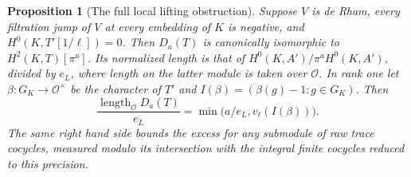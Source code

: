 \documentclass[a4paper,11pt]{article}
\newtheorem{proposition}{Proposition}[section]
\theoremstyle{definition}
\theoremstyle{remark}
\numberwithin{equation}{section}
\begin{document}
\begin{proposition}[The full local lifting obstruction]
\leavevmode\label{prop:negobstruction740}
Suppose \(V\) is de Rham, every filtration jump of \(V\) at every
embedding of \(K\) is negative, and \(H^0(K,T'[1/\ell])=0\).
Then \(D_a(T)\) is canonically isomorphic to \(H^2(K,T)[\pi^a]\).
Its normalized length is that of
\(H^0(K,A')/\pi^a H^0(K,A')\), divided by \(e_L\), where length
on the latter module is taken over \(\mathcal O\). In rank one
let \(\beta:G_K\to\mathcal O^\times\) be the character of \(T'\)
and \(I(\beta)=(\beta(g)-1:g\in G_K)\). Then
\[
     \frac{\operatorname{length}_{\mathcal O}D_a(T)}{e_L}
        =\min\bigl(a/e_L,v_\ell(I(\beta))\bigr).
 \tag{6}\label{eq:negobstruction740}
\]
The same right hand side bounds the excess for any submodule of
raw trace cocycles, measured modulo its intersection with the
integral finite cocycles reduced to this precision.
\end{proposition}
\end{document}
